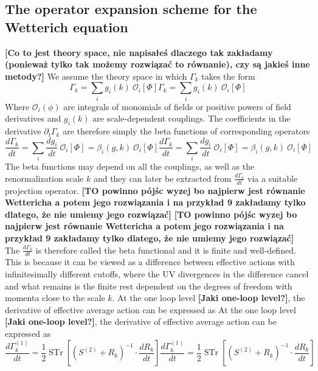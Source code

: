 \documentclass[11pt, a4paper]{article}
\newcommand{\jhkbf}[1]{\textbf{\color{red} [#1]}}
\newcommand{\jhkbf}[1]{\textbf{\color{red} [#1]}}
\begin{document}
\subsection{The operator expansion scheme for the Wetterich equation}
\jhkbf{Co to jest theory space, nie napisałeś dlaczego tak zakładamy (ponieważ tylko tak możemy rozwiązać to równanie), czy są jakieś inne metody?}
We assume the theory space in which $\Gamma_k$ takes the form
\begin{equation}
    \Gamma_k = \sum_i g_i(k) \ \mathcal{O}_i [\Phi]
    \Gamma_k = \sum_i g_i(k) \ \mathcal{O}_i [\Phi]
    \label{gamma_decomp}
\end{equation}
Where $\mathcal{O}_i (\phi)$ are integrals of monomials of fields or positive powers of field derivatives 
and $g_i(k)$ are scale-dependent couplings.
The coefficients in the derivative $\partial_t \Gamma_k$ are therefore simply the beta functions of corresponding operators
\begin{equation}
    \frac{d \Gamma_k}{dt} = \sum_i \frac{d g_i}{dt} \ \mathcal{O}_i [\Phi] = \beta_i(g,k) \ \mathcal{O}_i [\Phi]
    \frac{d \Gamma_k}{dt} = \sum_i \frac{d g_i}{dt} \ \mathcal{O}_i [\Phi] = \beta_i(g,k) \ \mathcal{O}_i [\Phi]
\end{equation}
The beta functions may depend on all the couplings, as well as the renormalization scale $k$ and
they can later be extracted from $\frac{d \Gamma_k}{dt}$ via a suitable projection operator. 
\jhkbf{TO powinno pójśc wyzej bo najpierw jest równanie Wettericha a potem jego rozwiązania i na przykład 9 zakładamy tylko dlatego, że nie umiemy jego rozwiązać}
\jhkbf{TO powinno pójśc wyzej bo najpierw jest równanie Wettericha a potem jego rozwiązania i na przykład 9 zakładamy tylko dlatego, że nie umiemy jego rozwiązać}
The $\frac{d \Gamma_k}{dt}$ is therefore called the beta functional and it is finite and well-defined.
This is because it can be viewed as a difference between effective actions with infinitesimally
different cutoffs, where the UV divergences in the difference cancel and what remains is the finite rest
dependent on the degrees of freedom with momenta close to the scale $k$.
At the one loop level \jhkbf{Jaki one-loop level?}, the derivative of effective average action can be expressed as
At the one loop level \jhkbf{Jaki one-loop level?}, the derivative of effective average action can be expressed as
\begin{equation}
    \frac{d \Gamma_k^{(1)}}{dt} = \frac{1}{2} \operatorname{STr} \left[ \left(S^{(2)} + R_k\right)^{-1} \cdot \frac{d R_k}{dt} \right]
    \label{1LEAA}
    \frac{d \Gamma_k^{(1)}}{dt} = \frac{1}{2} \operatorname{STr} \left[ \left(S^{(2)} + R_k\right)^{-1} \cdot \frac{d R_k}{dt} \right]
    \label{1LEAA}
\end{equation}
\end{document}
